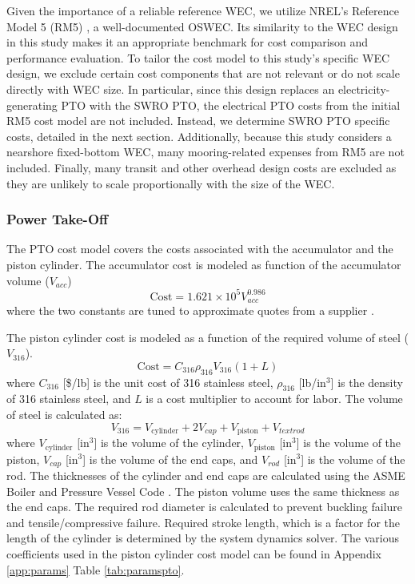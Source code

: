 \documentclass[twocolumn,10pt]{asme2e}
\begin{document}
Given the importance of a reliable reference WEC, we utilize NREL’s Reference Model 5 (RM5) \cite{rm5}, a well-documented OSWEC. Its similarity to the WEC design in this study makes it an appropriate benchmark for cost comparison and performance evaluation. To tailor the cost model to this study’s specific WEC design, we exclude certain cost components that are not relevant or do not scale directly with WEC size. In particular, since this design replaces an electricity-generating PTO with the SWRO PTO, the electrical PTO costs from the initial RM5 cost model are not included. Instead, we determine SWRO PTO specific costs, detailed in the next section. Additionally, because this study considers a nearshore fixed-bottom WEC, many mooring-related expenses from RM5 are not included. Finally, many transit and other overhead design costs are excluded as they are unlikely to scale proportionally with the size of the WEC. 

\subsubsection{Power Take-Off}

The PTO cost model covers the costs associated with the accumulator and the piston cylinder. The accumulator cost is modeled as function of the accumulator volume ($V_{acc}$)
\begin{equation}
    \text{Cost} = 1.621 \times 10^5 V_{acc} ^{0.986}
\end{equation}
\noindent where the two constants are tuned to approximate quotes from a supplier \cite{reasontek}. 

The piston cylinder cost is modeled as a function of the required volume of steel ($V_{\text{316}}$). 
\begin{equation}
    \text{Cost} = C_{\text{316}} \rho_{\text{316}} V_{\text{316}} (1+L)
\end{equation}
\noindent where $C_{\text{316}}$ [\$/lb] is the unit cost of 316 stainless steel, $\rho_{\text{316}}$ [lb/in$^3$] is the density of 316 stainless steel, and $L$ is a cost multiplier to account for labor. The volume of steel is calculated as:
\begin{equation}
    V_{\text{316}} = V_{\text{cylinder}} + 2V_{cap} + V_{\text{piston}} + V_{text{rod}}
\end{equation}
\noindent where $V_{\text{cylinder}}$ [in$^3$] is the volume of the cylinder, $V_{\text{piston}}$ [in$^3$] is the volume of the piston, $V_{cap}$ [in$^3$] is the volume of the end caps, and $V_{rod}$ [in$^3$] is the volume of the rod. The thicknesses of the cylinder and end caps are calculated using the ASME Boiler and Pressure Vessel Code \cite{ASME_BPVC}. The piston volume uses the same thickness as the end caps. The required rod diameter is calculated to prevent buckling failure and tensile/compressive failure. Required stroke length, which is a factor for the length of the cylinder is determined by the system dynamics solver. The various coefficients used in the piston cylinder cost model can be found in Appendix \ref{app:params} Table \ref{tab:paramspto}.
\end{document}
